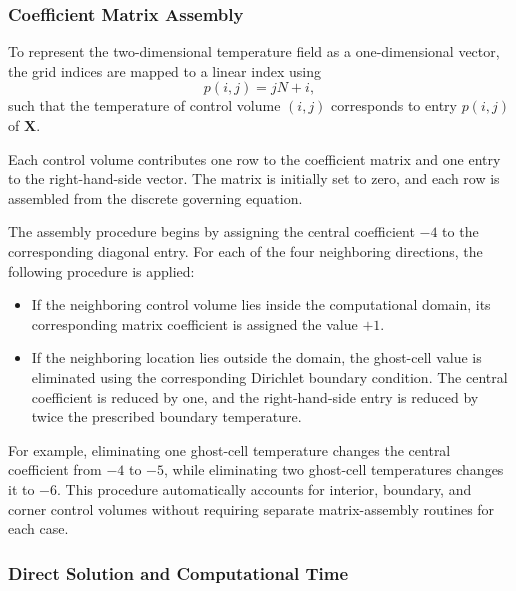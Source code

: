 
\subsubsection{Coefficient Matrix Assembly}

To represent the two-dimensional temperature field as a one-dimensional vector, the grid indices are mapped to a linear index using
\begin{equation}
p(i,j)=jN+i,
\label{eq:implicit_index_mapping}
\end{equation}
such that the temperature of control volume $(i,j)$ corresponds to entry $p(i,j)$ of $\mathbf{X}$.

Each control volume contributes one row to the coefficient matrix and one entry to the right-hand-side vector. The matrix is initially set to zero, and each row is assembled from the discrete governing equation.

The assembly procedure begins by assigning the central coefficient $-4$ to the corresponding diagonal entry. For each of the four neighboring directions, the following procedure is applied:

\begin{itemize}
    \item If the neighboring control volume lies inside the computational domain, its corresponding matrix coefficient is assigned the value $+1$.
    \item If the neighboring location lies outside the domain, the ghost-cell value is eliminated using the corresponding Dirichlet boundary condition. The central coefficient is reduced by one, and the right-hand-side entry is reduced by twice the prescribed boundary temperature.
\end{itemize}

For example, eliminating one ghost-cell temperature changes the central coefficient from $-4$ to $-5$, while eliminating two ghost-cell temperatures changes it to $-6$. This procedure automatically accounts for interior, boundary, and corner control volumes without requiring separate matrix-assembly routines for each case.


\subsubsection{Direct Solution and Computational Time}

